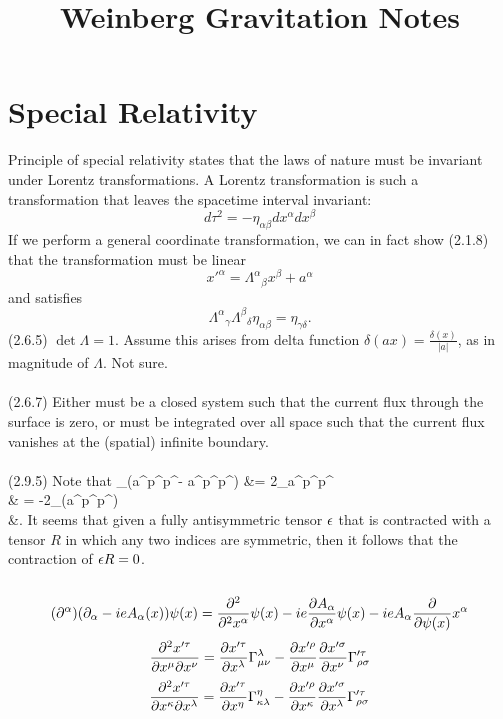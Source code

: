 \documentclass[10pt,letterpaper]{article}
\title{Weinberg Gravitation Notes}
\author{}
\date{}
\begin{document}
\maketitle
\section{Special Relativity}
Principle of special relativity states that the laws of nature must be invariant under Lorentz transformations. A Lorentz
transformation is such a transformation that leaves the spacetime interval invariant:
\[
	d\tau^2 = -\eta_{\alpha\beta}dx^\alpha dx^\beta
\]
If we perform a general coordinate transformation,
we can in fact show (2.1.8) that the transformation must be linear 
\[
	x'^\alpha = \Lambda^\alpha{}_\beta x^\beta + a^\alpha
\]
and satisfies
\[
	\Lambda^\alpha{}_\gamma \Lambda^\beta{}_\delta \eta_{\alpha\beta} = \eta_{\gamma\delta}.
\]
(2.6.5) $ \det \Lambda = 1$. Assume this arises from delta function $\delta(ax) = \frac{\delta(x)}{|a|}$, as in magnitude of 
$\Lambda$. Not sure. 
\\ \\
(2.6.7) Either must be a closed system such that the current flux through the surface is zero, or must be integrated
over all space such that the current flux vanishes at the (spatial) infinite boundary.
\\ \\
(2.9.5) Note that 
\ba
	\ep_{\alpha \beta \gamma \delta}(a^\beta p^\gamma p^\delta - a^\gamma p^\beta p^\delta) &=
	2\ep_{\alpha \beta \gamma \delta}a^\beta p^\gamma p^\delta\\
	& = -2\ep_{\alpha \beta \delta \gamma}(a^\beta p^\delta p^\gamma) \\
	&.
\ea
It seems that given a fully antisymmetric tensor $\ep$ that is contracted with a tensor $R$ in which any two indices are
symmetric, then it follows that the contraction of $\ep R = 0$. 
\\ \\
\[
	(\pd^\alpha)( \pd_\alpha - ieA_\alpha(x))\psi(x) = \frac{\pd^2}{\pd^2x^\alpha} \psi(x) - ie\pdiff[A_\alpha]{x^\alpha}\psi(x)
	-ieA_\alpha\pdiff{\psi(x)}{x^\alpha}
\]
\[
	\frac{\pd^2 x'^\tau}{\pd x^\mu \pd x^\nu} = \pdiff[x'^\tau]{x^\lambda}\Gamma^{\lambda}_{\mu \nu}
	- \pdiff[x'^\rho]{x^\mu}\pdiff[x'^\sigma]{x^\nu}\Gamma'^\tau_{\rho\sigma}
\]
\[
	\frac{\pd^2 x'^\tau}{\pd x^\kappa \pd x^\lambda} = \pdiff[x'^\tau]{x^\eta}\Gamma^{\eta}_{\kappa \lambda}
	- \pdiff[x'^\rho]{x^\kappa}\pdiff[x'^\sigma]{x^\lambda}\Gamma'^\tau_{\rho\sigma}
\]
\end{document}
